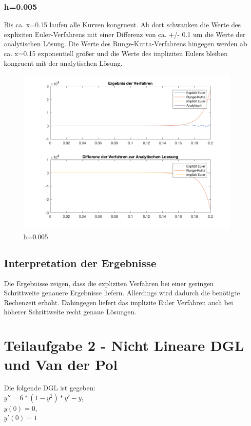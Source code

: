 \documentclass[]{scrartcl}
\begin{document}
\subsubsection{h=0.005}
Bis ca. x=0.15 laufen alle Kurven kongruent. Ab dort schwanken die Werte des expliziten Euler-Verfahrens mit einer Differenz von ca. +/- 0.1 um die Werte der analytischen Lösung. Die Werte des Runge-Kutta-Verfahrens hingegen werden ab ca. x=0.15 exponentiell größer und die Werte des impliziten Eulers bleiben kongruent mit der analytischen Lösung.
\begin{figure}[htbp]
	\centering
	\includegraphics[width=1\linewidth]{a1_1_4}
	\caption{h=0.005}
	\label{fig:a1_1_4}
\end{figure}

\subsection{Interpretation der Ergebnisse}
Die Ergebnisse zeigen, dass die expliziten Verfahren bei einer geringen Schrittweite genauere Ergebnisse liefern. Allerdings wird dadurch die benötigte Rechenzeit erhöht. Dahingegen liefert das implizite Euler Verfahren auch bei höherer Schrittweite recht genaue Lösungen.

\section{Teilaufgabe 2 - Nicht Lineare DGL und Van der Pol}
Die folgende DGL ist gegeben: \\
$ y'' = 6 * (1 - y^{2}) * y' - y $, \\
$ y(0) = 0 $, \\
$ y'(0) = 1 $ \\
\end{document}
